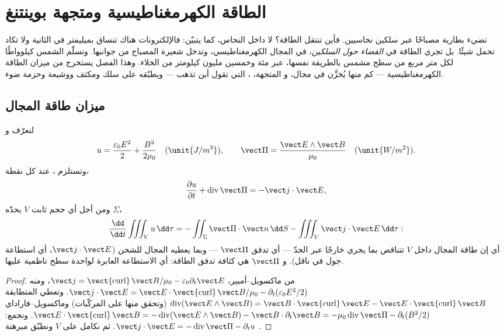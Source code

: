 \chapter{الطاقة الكهرمغناطيسية ومتجهة بوينتنغ}\label{ch:b2:poynting-vector}

تضيء بطارية مصباحًا عبر سلكين نحاسيين. فأين تنتقل
الطاقة؟ لا داخل النحاس، كما يتبيّن: فالإلكترونات
هناك تنساق بميليمتر في الثانية ولا تكاد تحمل شيئًا. بل
تجري الطاقة في \emph{الفضاء حول السلكين}، في المجال
الكهرمغناطيسي، وتدخل شعيرة المصباح من
جوانبها. وتسلّم الشمس كيلوواطًا لكل متر مربع من سطح مشمس
بالطريقة نفسها، عبر مئة وخمسين مليون كيلومتر من
الخلاء. وهذا الفصل يستخرج من  ميزان
الطاقة الكهرمغناطيسية --- كم منها يُخزَّن في مجال، و
المتجهة، ، التي تقول أين تذهب --- ويطبّقه على
سلك ومكثف ووشيعة وحزمة ضوء.

\section{ميزان طاقة المجال}

\begin{theorem}\label{thm:b2:poynting-vector:poynting}
لنعرّف \emph{} و\emph{}
\[
u = \frac{\varepsilon_0E^2}2 + \frac{B^2}{2\mu_0} \quad (\unit{J/m^3}) , \qquad
\vect\Pi = \frac{\vect E\wedge\vect B}{\mu_0} \quad (\unit{W/m^2}) .
\]
وتستلزم ، عند كل نقطة،
\[
\frac{\partial u}{\partial t} + \operatorname{div}\vect\Pi = -\vect j\cdot\vect E ,
\]
ومن أجل أي حجم ثابت $V$ يحدّه $\Sigma$،
\[
\frac{\dd}{\dd t}\iiint_Vu\,\dd\tau = -\iint_\Sigma\vect\Pi\cdot\vect n\,\dd S - \iiint_V\vect j\cdot\vect E\,\dd\tau :
\]
أي إن طاقة المجال داخل $V$ تتناقص بما يجري خارجًا عبر
الحدّ --- أي تدفق $\vect\Pi$ --- وبما يعطيه المجال
للشحن ($\vect j\cdot\vect E$، أي استطاعة جول في ناقل). و $\vect\Pi$
هي كثافة تدفق الطاقة: أي الاستطاعة العابرة لواحدة سطح ناظمية
عليها.
\end{theorem}

\begin{proof}
من ماكسويل--أمبير، $\vect j = \operatorname{\vect{curl}}\vect B/\mu_0 - \varepsilon_0\partial_t
\vect E$، ومنه $\vect j\cdot\vect E = \vect E\cdot\operatorname{\vect{curl}}\vect B/\mu_0 -
\partial_t(\varepsilon_0E^2/2)$. وتعطي المتطابقة $\operatorname{div}(\vect E\wedge\vect B) = \vect B
\cdot\operatorname{\vect{curl}}\vect E - \vect E\cdot\operatorname{\vect{curl}}\vect B$ (وتحقق منها
على المركّبات) وماكسويل--فاراداي $\vect E\cdot\operatorname{\vect{curl}}
\vect B = -\operatorname{div}(\vect E\wedge\vect B) - \vect B\cdot\partial_t\vect B = -\mu_0
\operatorname{div}\vect\Pi - \partial_t(B^2/2)$. ونجمع: $\vect j\cdot\vect E = -\operatorname{div}
\vect\Pi - \partial_tu$. ثم نكامل على $V$ ونطبّق مبرهنة .
\end{proof}


